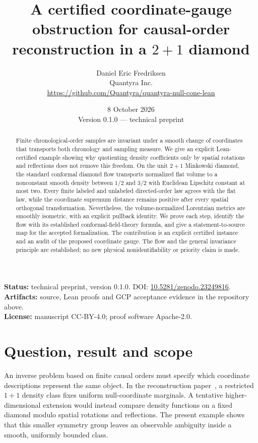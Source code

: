\documentclass[11pt]{article}
\title{A certified coordinate-gauge obstruction for causal-order reconstruction in a $2+1$ diamond}
\author{Daniel Eric Fredriksen\\Quantyra Inc.\\\url{https://github.com/Quantyra/quantyra-null-cone-lean}}
\date{8 October 2026\\Version 0.1.0 --- technical preprint}
\theoremstyle{remark}
\begin{document}
\maketitle
\begin{abstract}
Finite chronological-order samples are invariant under a smooth change of
coordinates that transports both chronology and sampling measure. We give an
explicit Lean-certified example showing why quotienting density coefficients
only by spatial rotations and reflections does not remove this freedom.
On the unit $2+1$ Minkowski diamond, the standard conformal diamond flow
transports normalized flat volume to a nonconstant smooth density between
$1/2$ and $3/2$ with Euclidean Lipschitz constant at most two.
Every finite labeled and unlabeled directed-order law agrees with the flat
law, while the coordinate supremum distance remains positive after every
spatial orthogonal transformation. Nevertheless, the volume-normalized
Lorentzian metrics are smoothly isometric, with an explicit pullback identity.
We prove each step, identify the flow with its established conformal-field-theory
formula, and give a statement-to-source map for the accepted formalization.
The contribution is an explicit certified instance and an audit of the
proposed coordinate gauge. The flow and the general invariance principle
are established; no new physical nonidentifiability or priority claim is made.
\end{abstract}

\noindent\textbf{Status:} technical preprint, version 0.1.0. DOI: \href{https://doi.org/10.5281/zenodo.23249816}{10.5281/zenodo.23249816}.\\
\textbf{Artifacts:} source, Lean proofs and GCP acceptance evidence in the repository above.\\
\textbf{License:} manuscript CC-BY-4.0; proof software Apache-2.0.

\section{Question, result and scope}
An inverse problem based on finite causal orders must specify which
coordinate descriptions represent the same object. In the reconstruction
paper~\cite{Fredriksen}, a restricted $1+1$ density class fixes uniform
null-coordinate marginals. A tentative higher-dimensional extension would
instead compare density functions on a fixed diamond modulo spatial
rotations and reflections. The present example shows that this smaller
symmetry group leaves an observable ambiguity inside a smooth, uniformly
bounded class.
\end{document}
